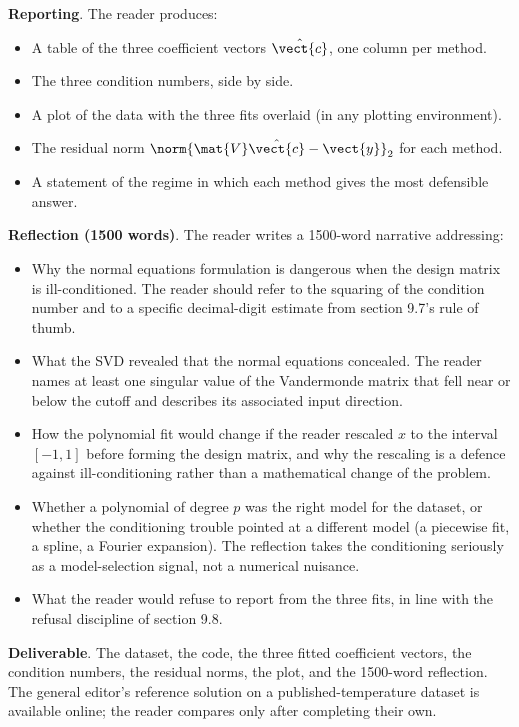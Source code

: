 \begin{project}
\textbf{Reporting}. The reader produces:

\begin{itemize}[leftmargin=*]
  \item A table of the three coefficient vectors $\hat{\vect{c}}$,
    one column per method.
  \item The three condition numbers, side by side.
  \item A plot of the data with the three fits overlaid (in any
    plotting environment).
  \item The residual norm $\norm{\mat{V}\hat{\vect{c}} -
    \vect{y}}_{2}$ for each method.
  \item A statement of the regime in which each method gives the
    most defensible answer.
\end{itemize}

\textbf{Reflection (1500 words)}. The reader writes a 1500-word
narrative addressing:

\begin{itemize}[leftmargin=*]
  \item Why the normal equations formulation is dangerous when the
    design matrix is ill-conditioned. The reader should refer to
    the squaring of the condition number and to a specific
    decimal-digit estimate from section 9.7's rule of thumb.
  \item What the SVD revealed that the normal equations
    concealed. The reader names at least one singular value of the
    Vandermonde matrix that fell near or below the cutoff and
    describes its associated input direction.
  \item How the polynomial fit would change if the reader rescaled
    $x$ to the interval $[-1, 1]$ before forming the design
    matrix, and why the rescaling is a defence against
    ill-conditioning rather than a mathematical change of the
    problem.
  \item Whether a polynomial of degree $p$ was the right model
    for the dataset, or whether the conditioning trouble pointed
    at a different model (a piecewise fit, a spline, a Fourier
    expansion). The reflection takes the conditioning seriously
    as a model-selection signal, not a numerical nuisance.
  \item What the reader would refuse to report from the three
    fits, in line with the refusal discipline of section 9.8.
\end{itemize}

\textbf{Deliverable}. The dataset, the code, the three fitted
coefficient vectors, the condition numbers, the residual norms,
the plot, and the 1500-word reflection. The general editor's
reference solution on a published-temperature dataset is available
online; the reader compares only after completing their own.


\end{project}
